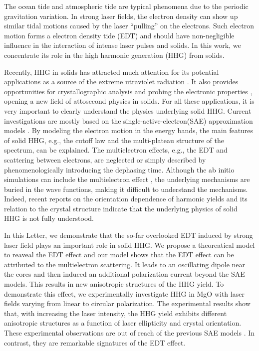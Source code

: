 \documentclass[aps,prl,10pt,preprint,nofootinbib]{revtex4-1}
\begin{document}
The ocean tide and atmospheric tide are typical phenomena due to the periodic gravitation variation. In strong laser fields, the electron density can show up similar tidal motions caused by the laser ``pulling'' on the electrons. Such electron motion forms a electron density tide (EDT) and should have non-negligible influence in the interaction of intense laser pulses and solids. In this work, we concentrate its role in the high harmonic generation (HHG) from solids. 

Recently, HHG in solids has attracted much attention for its potential applications as a source of the extreme utraviolet radiation \cite{Kim2017,Garg2018,McDonald2017,Vampa2017}. It also provides opportunities for crystallographic analysis and probing the electronic properties \cite{Zaks2012,Hohenleutner2015,Langer2016,Silva2018,Luu2018,Yu2018,Luu2015,Vampa2015,Lanin2017}, opening a new field of attosecond physics in solids. For all these applications, it is very important to clearly understand the physics underlying solid HHG. Current investigations are mostly based on the single-active-electron(SAE) approximation models \cite{Vampa2014,Higuchi2014,Luu2016,Osika2017,Mengxi2017,Mengxi2015,Ikemachi2017,Mengxi2016,Dejean2017,Golde2008,Bian2017,Osika2017,Li2018}. By modeling the electron motion in the energy bands, the main features of solid HHG, e.g., the cutoff law and the multi-plateau structure of the spectrum, can be explained. The multielectron effects, e.g., the EDT and scattering between electrons, are neglected or simply described by phenomenologically introducing the dephasing time. Although the ab initio simulations can include the multielectron effect \cite{dftsim1,dftsim2}, the underlying mechanisms are buried in the wave functions, making it difficult to understand the mechanisms. Indeed, recent reports on the orientation dependence of harmonic yields and its relation to the crystal structure \cite{You2016,Shima2017} indicate that the underlying physics of solid HHG is not fully understood.

In this Letter, we demonstrate that the so-far overlooked EDT induced by strong laser field plays an important role in solid HHG. We propose a theoreatical model to reaveal the EDT effect and our model shows that the EDT effect can be attributed to the multielectron scattering. It leads to an oscillating dipole near the cores and then induced an additional polarization current beyond the SAE models. This results in new anisotropic structures of the HHG yield. To demonstrate this effect, we experimentally investigate HHG in MgO with laser fields varying from linear to circular polarization. The experimental results show that, with increasing the laser intensity, the HHG yield exhibits different anisotropic structures as a function of laser ellipticity and crystal orientation. These experimental observations are out of reach of the previous SAE models \cite{Mengxi2017}. In contrast, they are remarkable signatures of the EDT effect.
\end{document}
